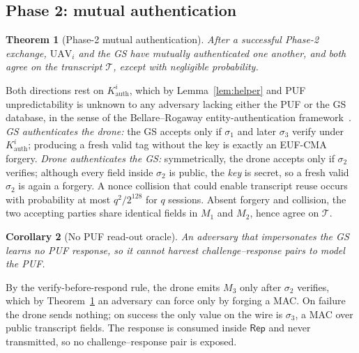 \documentclass[journal]{IEEEtran}
\newtheorem{theorem}{Theorem}
\newtheorem{corollary}[theorem]{Corollary}
\begin{document}
\subsection{Phase 2: mutual authentication}

\begin{theorem}[Phase-2 mutual authentication]
\label{thm:mutual}
After a successful Phase-2 exchange, $\text{UAV}_i$ and the GS have mutually
authenticated one another, and both agree on the transcript $\mathcal{T}$,
except with negligible probability.
\end{theorem}

\begin{IEEEproof}
Both directions rest on $K^{i}_{\text{auth}}$, which by Lemma~\ref{lem:helper}
and PUF unpredictability is unknown to any adversary lacking either the PUF or
the GS database, in the sense of the Bellare--Rogaway entity-authentication
framework~\cite{bellare_rogaway}. \emph{GS authenticates the drone:} the GS
accepts only if $\sigma_1$ and later $\sigma_3$ verify under $K^{i}_{\text{auth}}$;
producing a fresh valid tag without the key is exactly an EUF-CMA forgery.
\emph{Drone authenticates the GS:} symmetrically, the drone accepts only if
$\sigma_2$ verifies; although every field inside $\sigma_2$ is public, the
\emph{key} is secret, so a fresh valid $\sigma_2$ is again a forgery. A nonce
collision that could enable transcript reuse occurs with probability at most
$q^2/2^{128}$ for $q$ sessions. Absent forgery and collision, the two accepting
parties share identical fields in $M_1$ and $M_2$, hence agree on
$\mathcal{T}$.
\end{IEEEproof}

\begin{corollary}[No PUF read-out oracle]
\label{cor:oracle}
An adversary that impersonates the GS learns no PUF response, so it cannot
harvest challenge--response pairs to model the PUF.
\end{corollary}

\begin{IEEEproof}
By the verify-before-respond rule, the drone emits $M_3$ only after $\sigma_2$
verifies, which by Theorem~\ref{thm:mutual} an adversary can force only by
forging a MAC. On failure the drone sends nothing; on success the only value on
the wire is $\sigma_3$, a MAC over public transcript fields. The response is
consumed inside $\mathsf{Rep}$ and never transmitted, so no challenge--response
pair is exposed.
\end{IEEEproof}
\end{document}
